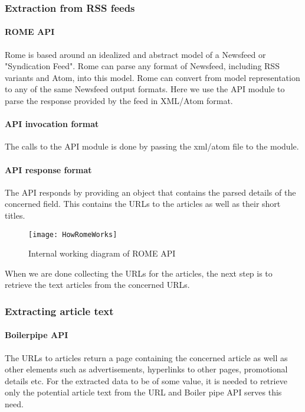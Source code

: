 \subsubsection{Extraction from RSS feeds}
\paragraph*{ROME API}
\hfill \break
Rome is based around an idealized and abstract model of a Newsfeed or "Syndication Feed". Rome can parse any format of Newsfeed, including RSS variants and Atom, into this model. Rome can convert from model representation to any of the same Newsfeed output formats. Here we use the API module to parse the response provided by the feed in XML/Atom format.\cite{romeapidocs}

\paragraph*{API invocation format}
\hfill
\par The calls to the API module is done by passing the xml/atom file to the module.
\paragraph*{API response format}
\hfill \break
The API responds by providing an object that contains the parsed details of the concerned field. This contains the URLs to the articles as well as their short titles.
\begin{figure}[h]
	\texttt{[image: HowRomeWorks]}
	\centering
	\caption{Internal working diagram of ROME API}
\end{figure}
\par When we are done collecting the URLs for the articles, the next step is to retrieve the text articles from the concerned URLs. 

\subsubsection{Extracting article text}
\paragraph*{Boilerpipe API}
\hfill \break
The URLs to articles return a page containing the concerned article as well as other elements such as advertisements, hyperlinks to other pages, promotional details etc. For the extracted data to be of some value, it is needed to retrieve only the potential article text from the URL and Boiler pipe API serves this need.
